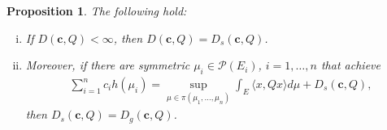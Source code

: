 \documentclass[10pt]{article}
\newtheorem{proposition}[theorem]{Proposition}
\begin{document}
 \begin{proposition}\label{prop:ExtremizedImpliesGaussian} The following hold:
 \begin{enumerate}[(i)]
 \item If $D(\mathbf{c},Q) <\infty$, then $D(\mathbf{c},Q) =D_s(\mathbf{c},Q)$.    
 \item Moreover, if  there are symmetric $\mu_i \in \mathcal{P}(E_i)$, $i=1, \dots, n$ that achieve 
 \begin{align}
 \sum_{i=1}^n c_i h(\mu_i)   =  \sup_{\mu \in \pi(\mu_1, \dots, \mu_n) } \int_E \langle x, Q x\rangle d\mu  + D_s(\mathbf{c},Q), \label{eq:extremized}
 \end{align}
 then $D_s(\mathbf{c},Q) = D_g(\mathbf{c},Q)$. 
 \end{enumerate}
 \end{proposition}
\end{document}
